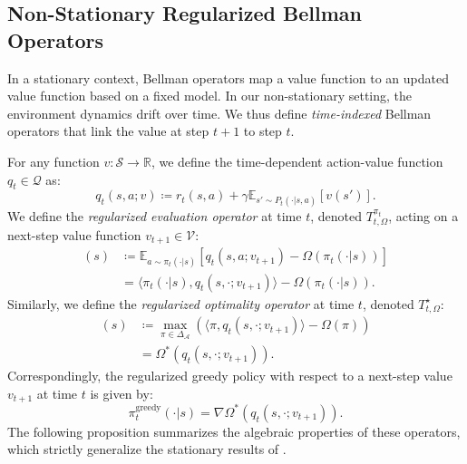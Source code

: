 \documentclass{article}
\theoremstyle{plain}
\theoremstyle{definition}
\theoremstyle{remark}
\newcommand{\E}{\mathbb{E}}
\newcommand{\1}{\mathbbm{1}}
\newcommand{\R}{\mathbb{R}}
\newcommand{\Sspace}{\mathcal{S}}
\newcommand{\Aspace}{\mathcal{A}}
\newcommand{\Simplex}{\Delta_{\Aspace}}
\newcommand{\inner}[2]{\langle #1, #2 \rangle}
\newcommand{\Tpi}[2]{T^{\pi_{#1}}_{#1, \Omega}} %
\newcommand{\Tstar}[1]{T^{\star}_{#1, \Omega}} %
\begin{document}
\subsection{Non-Stationary Regularized Bellman Operators}
In a stationary context, Bellman operators map a value function to an updated value function based on a fixed model. In our non-stationary setting, the environment dynamics drift over time. We thus define \textit{time-indexed} Bellman operators that link the value at step $t+1$ to step $t$.

For any function $v: \Sspace \to \R$, we define the time-dependent action-value function $q_t \in \mathcal{Q}$ as:
\begin{equation}
    q_t(s, a; v) \coloneqq r_t(s, a) + \gamma \E_{s' \sim P_t(\cdot|s, a)}[v(s')].
\end{equation}
We define the \textit{regularized evaluation operator} at time $t$, denoted $\Tpi{t}{}$, acting on a next-step value function $v_{t+1} \in \mathcal{V}$:
\begin{align}
    [\Tpi{t}{} v_{t+1}](s) &\coloneqq \E_{a \sim \pi_t(\cdot|s)} [q_t(s, a; v_{t+1}) - \Omega(\pi_t(\cdot|s))] \nonumber \\
    &= \inner{\pi_t(\cdot|s)}{q_t(s, \cdot; v_{t+1})} - \Omega(\pi_t(\cdot|s)). \label{eq:eval_op}
\end{align}
Similarly, we define the \textit{regularized optimality operator} at time $t$, denoted $\Tstar{t}$:
\begin{align}
    [\Tstar{t} v_{t+1}](s) &\coloneqq \max_{\pi \in \Simplex} \left( \inner{\pi}{q_t(s, \cdot; v_{t+1})} - \Omega(\pi) \right) \nonumber \\
    &= \Omega^*(q_t(s, \cdot; v_{t+1})). \label{eq:opt_op}
\end{align}
Correspondingly, the regularized greedy policy with respect to a next-step value $v_{t+1}$ at time $t$ is given by:
\begin{equation}
    \pi^{\text{greedy}}_t(\cdot|s) = \nabla \Omega^*(q_t(s, \cdot; v_{t+1})).
\end{equation}
The following proposition summarizes the algebraic properties of these operators, which strictly generalize the stationary results of \cite{geist2019theory}.
\end{document}
